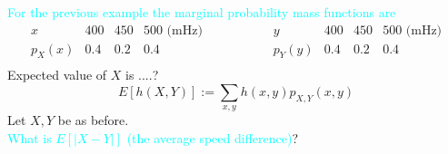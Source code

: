 \documentclass[20pt,landscape]{foils}
\newcommand{\no}{\noindent}
\begin{document}
\foilhead[-.8in]{\textcolor{blue}{Previous example again...}}   
\no {\textcolor{magenta}{Example}} {\textcolor{cyan} {For the previous example the marginal probability mass
    functions are}}
    \[
    \begin{array}{c||ccc}
	x & 400 & 450 & 500 \text{ (mHz)} \\ \hline
	p_{X}(x) & 0.4 & 0.2 & 0.4 \\
    \end{array}
    \hspace{2cm}
    \begin{array}{c||ccc}
	y & 400 & 450 & 500 \text{ (mHz)} \\ \hline
	p_{Y}(y) & 0.4 & 0.2 & 0.4 \\
    \end{array}
    \]
\no {\textcolor{magenta}{Recall:}} Expected value of $X$ is ....?\\[.1in]
\no {\textcolor{magenta}{Expected value for a function of several variables:}}
$$E[h(X,Y)] := \sum_{x,y} h(x,y) p_{X,Y}(x,y)$$
\no {\textcolor{red}{Continued Example:} } Let $X,Y$ be as before.\\[.1in]
\no  {\textcolor{magenta}{Question 3:}} {\textcolor{cyan} {What is $E[|X-Y|]$ (the average speed difference)}}?
\end{document}
